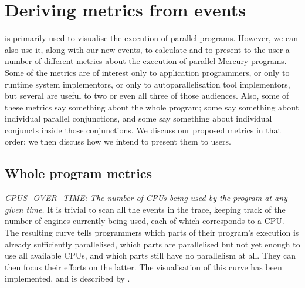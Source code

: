 \section{Deriving metrics from events}
\label{sec:analysis}

\tscope is primarily used to visualise the execution of parallel programs.
However, we can also use it, along with our new events,
to calculate and to present to the user
a number of different metrics about the execution of parallel Mercury programs.
Some of the metrics are of interest
only to application programmers,
or only to runtime system implementors,
or only to autoparallelisation tool implementors,
but several are useful to two or even all three of those audiences.
Also, some of these metrics say something about the whole program;
some say something about individual parallel conjunctions,
and some say something about individual conjuncts inside those conjunctions.
We discuss our proposed metrics in that order;
we then discuss how we intend to present them to users.

% 

\subsection{Whole program metrics}



\emph{CPUS\_OVER\_TIME:
The number of CPUs being used by the program at any given time.}
It is trivial to scan all the events in the trace,
keeping track of the number of engines currently being used,
each of which corresponds to a CPU.
The resulting curve tells programmers
which parts of their program's execution is already sufficiently parallelised,
which parts are parallelised but not yet enough to use all available CPUs,
and which parts still have no parallelism at all.
They can then focus their efforts on the latter.
The visualisation of this curve has been implemented,
and is described by \citet{threadscope}.

